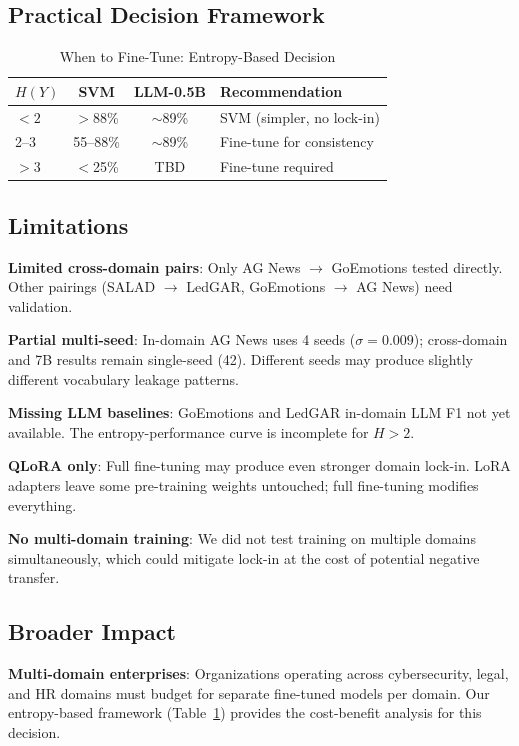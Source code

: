 \documentclass[journal]{IEEEtran}
\begin{document}
\subsection{Practical Decision Framework}

\begin{table}[!ht]
\centering
\caption{When to Fine-Tune: Entropy-Based Decision}
\label{tab:decision}
\begin{tabular}{lccl}
\toprule
$H(Y)$ & \textbf{SVM} & \textbf{LLM-0.5B} & \textbf{Recommendation} \\
\midrule
$< 2$ & $>$88\% & $\sim$89\% & SVM (simpler, no lock-in) \\
2--3 & 55--88\% & $\sim$89\% & Fine-tune for consistency \\
$> 3$ & $<$25\% & TBD & Fine-tune required \\
\bottomrule
\end{tabular}
\end{table}

\subsection{Limitations}
\textbf{Limited cross-domain pairs}: Only AG News $\to$ GoEmotions tested directly. Other pairings (SALAD $\to$ LedGAR, GoEmotions $\to$ AG News) need validation.

\textbf{Partial multi-seed}: In-domain AG News uses 4 seeds ($\sigma = 0.009$); cross-domain and 7B results remain single-seed (42). Different seeds may produce slightly different vocabulary leakage patterns.

\textbf{Missing LLM baselines}: GoEmotions and LedGAR in-domain LLM F1 not yet available. The entropy-performance curve is incomplete for $H > 2$.

\textbf{QLoRA only}: Full fine-tuning may produce even stronger domain lock-in. LoRA adapters leave some pre-training weights untouched; full fine-tuning modifies everything.

\textbf{No multi-domain training}: We did not test training on multiple domains simultaneously, which could mitigate lock-in at the cost of potential negative transfer.

\subsection{Broader Impact}
\textbf{Multi-domain enterprises}: Organizations operating across cybersecurity, legal, and HR domains must budget for separate fine-tuned models per domain. Our entropy-based framework (Table~\ref{tab:decision}) provides the cost-benefit analysis for this decision.
\end{document}
